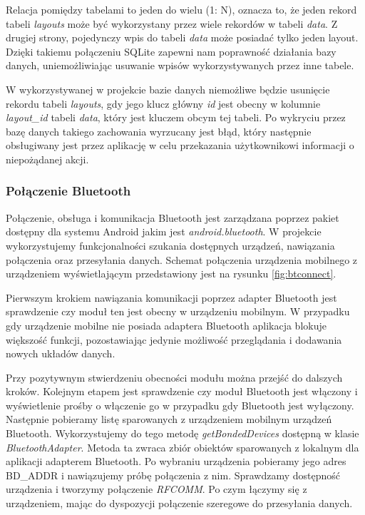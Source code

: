 \documentclass[a4paper,12pt, twoside]{article}
\begin{document}
        Relacja pomiędzy tabelami to jeden do wielu (1: N), oznacza to, że jeden rekord tabeli \textit{layouts} może być wykorzystany przez wiele rekordów w tabeli \textit{data}. Z drugiej strony, pojedynczy wpis do tabeli \textit{data} może posiadać tylko jeden layout. Dzięki takiemu połączeniu SQLite zapewni nam poprawność działania bazy danych, uniemożliwiając usuwanie wpisów wykorzystywanych przez inne tabele. 
        
        W wykorzystywanej w projekcie bazie danych niemożliwe będzie usunięcie rekordu tabeli \textit{layouts}, gdy jego klucz główny \textit{id} jest obecny w kolumnie \textit{layout\_id} tabeli \textit{data}, który jest kluczem obcym tej tabeli. Po wykryciu przez bazę danych takiego zachowania wyrzucany jest błąd, który następnie obsługiwany jest przez aplikację w celu przekazania użytkownikowi informacji o niepożądanej akcji.
    	
    	\vspace{.5cm}
    	\subsubsection{Połączenie Bluetooth}
    	Połączenie, obsługa i komunikacja Bluetooth jest zarządzana poprzez pakiet dostępny dla systemu Android jakim jest \textit{android.bluetooth}\cite{android.bluetooth}. W projekcie wykorzystujemy funkcjonalności szukania dostępnych urządzeń, nawiązania połączenia oraz przesyłania danych. Schemat połączenia urządzenia mobilnego z urządzeniem wyświetlającym przedstawiony jest na rysunku \ref{fig:btconnect}. 
    	
    	Pierwszym krokiem nawiązania komunikacji poprzez adapter Bluetooth jest sprawdzenie czy moduł ten jest obecny w urządzeniu mobilnym. W przypadku gdy urządzenie mobilne nie posiada adaptera Bluetooth aplikacja blokuje większość funkcji, pozostawiając jedynie możliwość przeglądania i dodawania nowych układów danych. 
    	
    	Przy pozytywnym stwierdzeniu obecności modułu można przejść do dalszych kroków. Kolejnym etapem jest sprawdzenie czy moduł Bluetooth jest włączony i wyświetlenie prośby o włączenie go w przypadku gdy Bluetooth jest wyłączony. Następnie pobieramy listę sparowanych z urządzeniem mobilnym urządzeń Bluetooth. Wykorzystujemy do tego metodę \textit{getBondedDevices}\cite{bonded} dostępną w klasie \textit{BluetoothAdapter}. Metoda ta zwraca zbiór obiektów sparowanych z lokalnym dla aplikacji adapterem Bluetooth. Po wybraniu urządzenia pobieramy jego adres BD\_ADDR i nawiązujemy próbę połączenia z nim. Sprawdzamy dostępność urządzenia i tworzymy połączenie \textit{RFCOMM}\cite{rfcomm}. Po czym łączymy się z urządzeniem, mając do dyspozycji połączenie szeregowe do przesyłania danych.
    	
\end{document}
